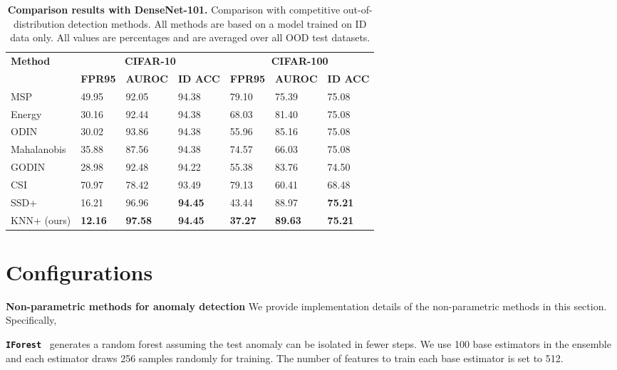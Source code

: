 \documentclass[nohyperref]{article}
\theoremstyle{plain}
\theoremstyle{definition}
\theoremstyle{remark}
\begin{document}
\begin{table*}[b] 
\centering
\vspace{-0.3cm}
\caption[]{\small \textbf{Comparison results with DenseNet-101.} Comparison with competitive out-of-distribution detection methods. All methods are based on a model trained on {ID data only}.  All values are percentages and are averaged over all OOD test datasets.}
\footnotesize
\begin{tabular}{l|lll|lll}
\toprule
\multirow{2}{*}{\textbf{Method}}  & \multicolumn{3}{c|}{\textbf{CIFAR-10}} & \multicolumn{3}{c}{\textbf{CIFAR-100}} \\
  & \textbf{FPR95}  & \textbf{AUROC}  & \textbf{ID ACC}  & \textbf{FPR95}  & \textbf{AUROC}  & \textbf{ID ACC}  \\ \midrule
MSP & 49.95 & 92.05 & 94.38 & 79.10 & 75.39 & 75.08 \\ 
Energy & 30.16 & 92.44 & 94.38 & 68.03 & 81.40 & 75.08 \\ 
ODIN & 30.02 & 93.86 & 94.38 & 55.96 & 85.16 & 75.08 \\ 
Mahalanobis & 35.88 & 87.56 & 94.38 & 74.57 & 66.03 & 75.08 \\ 
GODIN & 28.98 & 92.48 & 94.22 & 55.38 & 83.76 & 74.50 \\ 
CSI & 70.97 & 78.42 & 93.49 & 79.13 & 60.41 & 68.48 \\ 
SSD+ & 16.21 & 96.96 &  \textbf{94.45} &  43.44 & 88.97  &  \textbf{75.21}\\ 
KNN+ (ours) & \textbf{12.16} & \textbf{97.58} & \textbf{94.45}  & \textbf{37.27} & \textbf{89.63} & \textbf{75.21} \\
  \bottomrule
\end{tabular}
        \vspace{-0.2cm}
        \label{tab:other-arc}
\end{table*}


\vspace{-1cm}
\section{Configurations}
\label{sec:config}

\textbf{Non-parametric methods for anomaly detection} We provide implementation details of the non-parametric methods in this section. Specifically,

\texttt{\textbf{IForest}}~\citep{liu2008iforest} generates a random forest assuming the test anomaly can be isolated in fewer steps. We use 100 base estimators in the ensemble and each estimator draws 256 samples randomly for training. The number of features to train each base estimator is set to 512.   
\end{document}
